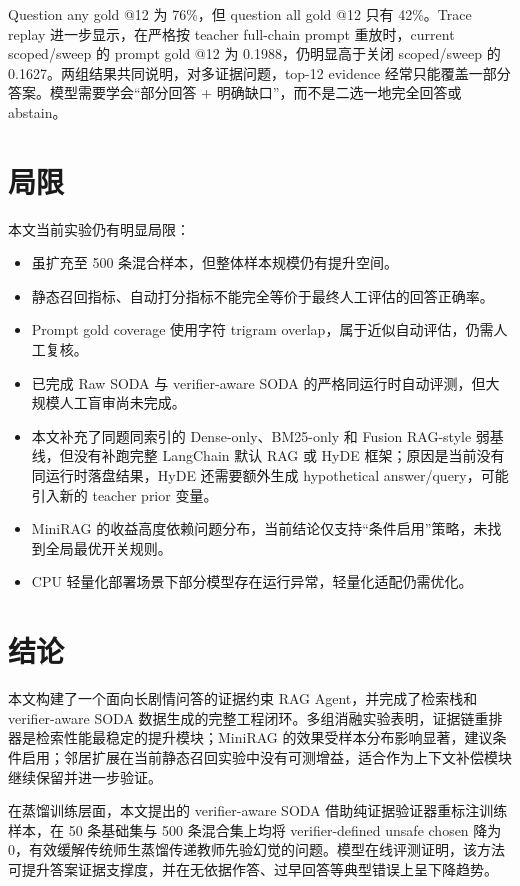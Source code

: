 \documentclass[UTF8,a4paper,12pt]{ctexart}
\begin{document}
Question any gold @12 为 76\%，但 question all gold @12 只有 42\%。Trace replay 进一步显示，在严格按 teacher full-chain prompt 重放时，current scoped/sweep 的 prompt gold @12 为 0.1988，仍明显高于关闭 scoped/sweep 的 0.1627。两组结果共同说明，对多证据问题，top-12 evidence 经常只能覆盖一部分答案。模型需要学会“部分回答 + 明确缺口”，而不是二选一地完全回答或 abstain。

\section{局限}

本文当前实验仍有明显局限：
\begin{itemize}
  \item 虽扩充至 500 条混合样本，但整体样本规模仍有提升空间。
  \item 静态召回指标、自动打分指标不能完全等价于最终人工评估的回答正确率。
  \item Prompt gold coverage 使用字符 trigram overlap，属于近似自动评估，仍需人工复核。
  \item 已完成 Raw SODA 与 verifier-aware SODA 的严格同运行时自动评测，但大规模人工盲审尚未完成。
  \item 本文补充了同题同索引的 Dense-only、BM25-only 和 Fusion RAG-style 弱基线，但没有补跑完整 LangChain 默认 RAG 或 HyDE 框架；原因是当前没有同运行时落盘结果，HyDE 还需要额外生成 hypothetical answer/query，可能引入新的 teacher prior 变量。
  \item MiniRAG 的收益高度依赖问题分布，当前结论仅支持“条件启用”策略，未找到全局最优开关规则。
  \item CPU 轻量化部署场景下部分模型存在运行异常，轻量化适配仍需优化。
\end{itemize}

\section{结论}

本文构建了一个面向长剧情问答的证据约束 RAG Agent，并完成了检索栈和 verifier-aware SODA 数据生成的完整工程闭环。多组消融实验表明，证据链重排器是检索性能最稳定的提升模块；MiniRAG 的效果受样本分布影响显著，建议条件启用；邻居扩展在当前静态召回实验中没有可测增益，适合作为上下文补偿模块继续保留并进一步验证。

在蒸馏训练层面，本文提出的 verifier-aware SODA 借助纯证据验证器重标注训练样本，在 50 条基础集与 500 条混合集上均将 verifier-defined unsafe chosen 降为 0，有效缓解传统师生蒸馏传递教师先验幻觉的问题。模型在线评测证明，该方法可提升答案证据支撑度，并在无依据作答、过早回答等典型错误上呈下降趋势。
\end{document}
